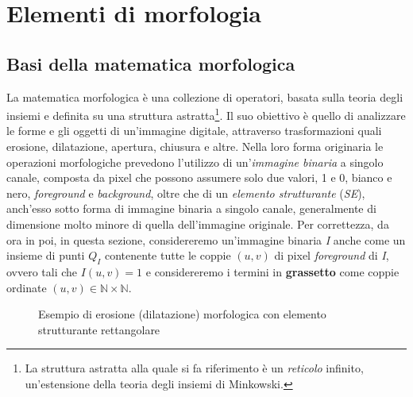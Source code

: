 \section{Elementi di morfologia}

\subsection{Basi della matematica morfologica}
La matematica morfologica \`e una collezione di operatori, basata sulla teoria degli insiemi e definita su una struttura astratta\footnote{La struttura astratta alla quale si fa riferimento \`e un \textit{reticolo} infinito, un'estensione della teoria degli insiemi di Minkowski.}. Il suo obiettivo \`e quello di analizzare le forme e gli oggetti di un'immagine digitale, attraverso trasformazioni quali erosione, dilatazione, apertura, chiusura e altre. Nella loro forma originaria le operazioni morfologiche prevedono l'utilizzo di un'\textit{immagine binaria} a singolo canale, composta da pixel che possono assumere solo due valori, 1 e 0, bianco e nero, \textit{foreground} e \textit{background}, oltre che di un \textit{elemento strutturante} (\textit{SE}), anch'esso sotto forma di immagine binaria a singolo canale, generalmente di dimensione molto minore di quella dell'immagine originale. Per correttezza, da ora in poi, in questa sezione, considereremo un'immagine binaria \textit{I} anche come un insieme di punti $Q_{I}$ contenente tutte le coppie $(u,v)$ di pixel \textit{foreground} di \textit{I}, ovvero tali che $I(u, v) = 1$ e considereremo i termini in \textbf{grassetto} come coppie ordinate $(u,v) \in \mathbb{N}\times\mathbb{N}$.
\begin{figure}[t]
	\centering
	\caption{Esempio di erosione (dilatazione) morfologica con elemento strutturante rettangolare} \label{fig:erosion-dilation}
\end{figure}
